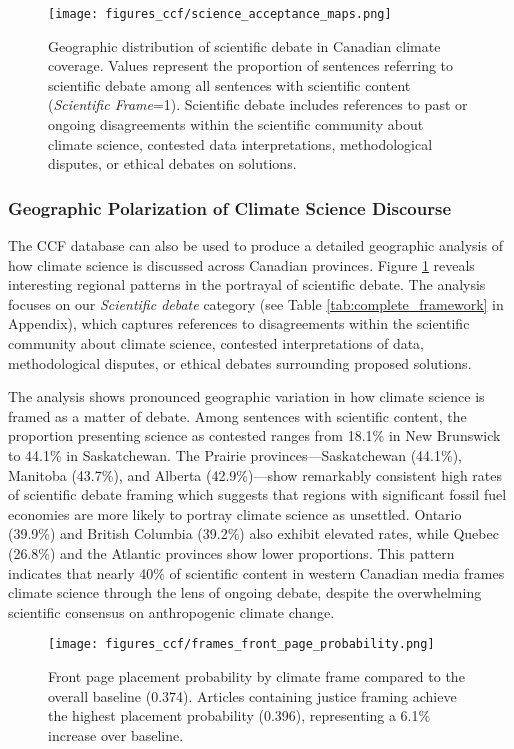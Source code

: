 \documentclass[12pt]{article}
\begin{document}
\begin{figure}[!b]
\centering
\texttt{[image: figures\_ccf/science\_acceptance\_maps.png]}
\caption{Geographic distribution of scientific debate in Canadian climate coverage. Values represent the proportion of sentences referring to scientific debate among all sentences with scientific content (\emph{Scientific Frame}=1). Scientific debate includes references to past or ongoing disagreements within the scientific community about climate science, contested data interpretations, methodological disputes, or ethical debates on solutions.}
\label{fig:science_acceptance}
\end{figure}

\subsubsection{Geographic Polarization of Climate Science Discourse}

The CCF database can also be used to produce a detailed geographic analysis of how climate science is discussed across Canadian provinces. Figure \ref{fig:science_acceptance} reveals interesting regional patterns in the portrayal of scientific debate. The analysis focuses on our \emph{Scientific debate} category (see Table \ref{tab:complete_framework} in Appendix), which captures references to disagreements within the scientific community about climate science, contested interpretations of data, methodological disputes, or ethical debates surrounding proposed solutions.

The analysis shows pronounced geographic variation in how climate science is framed as a matter of debate. Among sentences with scientific content, the proportion presenting science as contested ranges from 18.1\% in New Brunswick to 44.1\% in Saskatchewan. The Prairie provinces—Saskatchewan (44.1\%), Manitoba (43.7\%), and Alberta (42.9\%)—show remarkably consistent high rates of scientific debate framing which suggests that regions with significant fossil fuel economies are more likely to portray climate science as unsettled. Ontario (39.9\%) and British Columbia (39.2\%) also exhibit elevated rates, while Quebec (26.8\%) and the Atlantic provinces show lower proportions. This pattern indicates that nearly 40\% of scientific content in western Canadian media frames climate science through the lens of ongoing debate, despite the overwhelming scientific consensus on anthropogenic climate change. 

\begin{figure}[b!]
\centering
\texttt{[image: figures\_ccf/frames\_front\_page\_probability.png]}
\caption{Front page placement probability by climate frame compared to the overall baseline (0.374). Articles containing justice framing achieve the highest placement probability (0.396), representing a 6.1\% increase over baseline.}
\label{fig:frames_front_page}
\end{figure}
\end{document}

